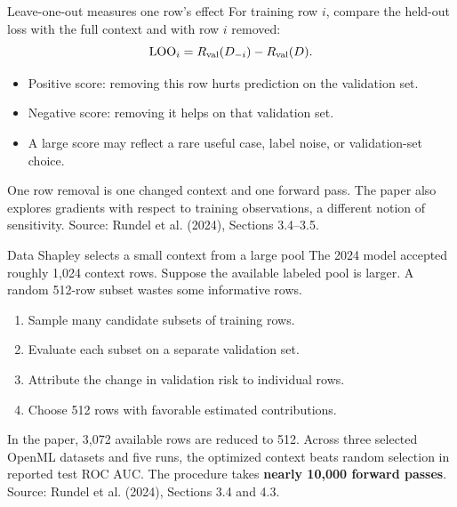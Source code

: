 \documentclass[aspectratio=169]{beamer}
\begin{document}
\begin{frame}{Leave-one-out measures one row's effect}
  \small
  For training row $i$, compare the held-out loss with the full context and
  with row $i$ removed:
  \[\mathrm{LOO}_i=R_{\rm val}(D_{-i})-R_{\rm val}(D).\]
  \vskip 8pt
  \begin{itemize}\itemsep 7pt
    \item Positive score: removing this row hurts prediction on the validation set.
    \item Negative score: removing it helps on that validation set.
    \item A large score may reflect a rare useful case, label noise, or validation-set choice.
  \end{itemize}
  \vskip 8pt
  One row removal is one changed context and one forward pass. The paper also
  explores gradients with respect to training observations, a different notion
  of sensitivity.
  \vskip 4pt
  {\scriptsize Source: Rundel et al. (2024), Sections 3.4--3.5.}
\end{frame}

\begin{frame}{Data Shapley selects a small context from a large pool}
  \small
  The 2024 model accepted roughly 1,024 context rows. Suppose the available
  labeled pool is larger. A random 512-row subset wastes some informative rows.
  \vskip 7pt
  \begin{enumerate}\itemsep 5pt
    \item Sample many candidate subsets of training rows.
    \item Evaluate each subset on a separate validation set.
    \item Attribute the change in validation risk to individual rows.
    \item Choose 512 rows with favorable estimated contributions.
  \end{enumerate}
  \vskip 8pt
  In the paper, 3,072 available rows are reduced to 512. Across three selected
  OpenML datasets and five runs, the optimized context beats random selection
  in reported test ROC AUC. The procedure takes \textbf{nearly 10,000 forward passes}.
  \vskip 4pt
  {\scriptsize Source: Rundel et al. (2024), Sections 3.4 and 4.3.}
\end{frame}
\end{document}
